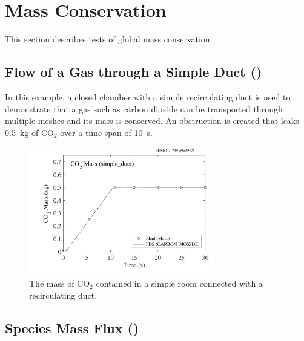 \documentclass[11pt]{book}
\begin{document}
\section{Mass Conservation}

This section describes tests of global mass conservation.

\subsection{Flow of a Gas through a Simple Duct (\texorpdfstring{}{simple\_duct})}
\label{simple_duct}

In this example, a closed chamber with a simple recirculating duct is used to demonstrate that a gas such as carbon dioxide can be transported
through multiple meshes and its mass is conserved. An obstruction is created that leaks 0.5~kg of CO$_2$ over a time span of 10~s.

\begin{figure}[ht]
\centering
\includegraphics[height=2.2in]{SCRIPT_FIGURES/simple_duct_mass}
\caption[The  test case]{The mass of CO$_2$ contained in a simple room connected with a recirculating duct.}
\label{simple_duct_fig}
\end{figure}


\subsection{Species Mass Flux (\texorpdfstring{}{species\_conservation})}
\label{species_conservation_1}
\label{species_conservation_2}
\label{species_conservation_3}
\label{species_conservation_4}
\end{document}

